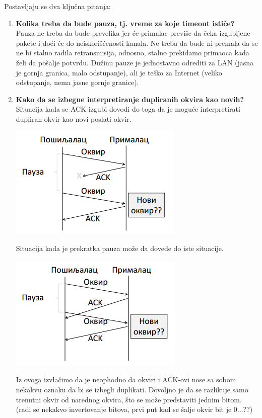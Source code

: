 \documentclass{article} %
\begin{document}
Postavljaju se dva ključna pitanja:
\begin{enumerate}
	\item \textbf{Kolika treba da bude pauza, tj. vreme za koje timeout ističe?}\\
	Pauza ne treba da bude prevelika jer će primalac previše da čeka izgubljene pakete i doći će do neiskorišćenosti kanala. Ne treba da bude ni premala da se ne bi stalno radila retransmisija, odnosno, stalno prekidamo primaoca kada želi da pošalje potvrdu. Dužinu pauze je jednostavno odrediti za LAN (jasna je gornja granica, malo odstupanje), ali je teško za Internet (veliko odstupanje, nema jasne gornje granice).
	\item \textbf{Kako da se izbegne interpretiranje dupliranih okvira kao novih?}\\
	Situacija kada se ACK izgubi dovodi do toga da je moguće interpretirati dupliran okvir kao novi poslati okvir.
\begin{center}
	\includegraphics[scale=0.5]{ARQ2}
\end{center}
	Situacija kada je prekratka pauza može da dovede do iste situacije.
\begin{center}
	\includegraphics[scale=0.5]{ARQ3}
\end{center}
Iz ovoga izvlačimo da je neophodno da okviri i ACK-ovi nose sa sobom nekakvu oznaku da bi se izbegli duplikati. Dovoljno je da se razlikuje samo trenutni okvir od narednog okvira, što se može predstaviti jednim bitom.
(radi se nekakvo invertovanje bitova, prvi put kad se šalje okvir bit je 0...??)
\end{enumerate}
\end{document}
